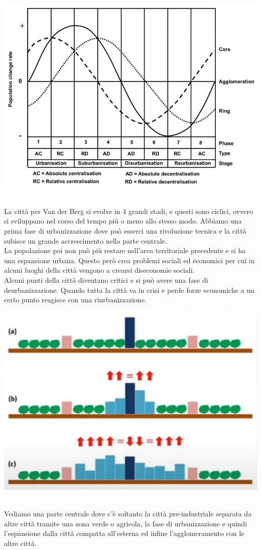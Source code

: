 \documentclass[a4paper,12pt, oneside]{book}
\begin{document}
  \begin{center}
  	\includegraphics[width=0.8\linewidth]{"immagini/van der berg stadi urbanizzazione"}
  	\label{fig:van der berg stadi urbanizzazione}
  \end{center}
  \leavevmode\\ 
  La città per Van der Berg si evolve in 4 grandi stadi, e questi sono ciclici, ovvero si sviluppano nel corso del tempo più o meno allo stesso modo. Abbiamo una prima fase di urbanizzazione dove può esserci una rivoluzione tecnica e la città subisce un grande accrescimento nella parte centrale.\\
  La popolazione poi non può più restare nell'area territoriale precedente e si ha una espansione urbana. Questo però crea problemi sociali ed economici per cui in alcuni luoghi della città vengono a crearsi diseconomie sociali.\\
  Alcuni punti della città diventano critici e si può avere una fase di deurbanizzazione. Quando tutta la città va in crisi e perde forze economiche a un certo punto reagisce con una riurbanizzazione.\\
  \begin{center}
  	\includegraphics[width=0.6\linewidth]{"immagini/stadi urbanizzazione grafico"}
  	\label{fig:stadi urbanizzazione grafico}
  \end{center}
  \leavevmode\\
  Vediamo una parte centrale dove c'è soltanto la città pre-industriale separata da altre città tramite una zona verde o agricola, la fase di urbanizzazione e quindi l'espansione dalla città compatta all'esterna ed infine l'agglomeramento con le altre città.\\
\end{document}
